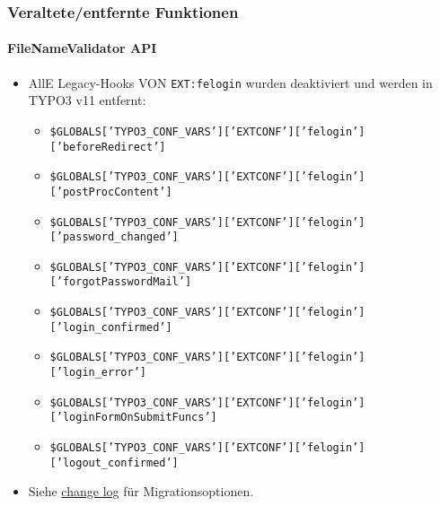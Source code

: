 
\begin{frame}[fragile]
	\frametitle{Veraltete/entfernte Funktionen}
	\framesubtitle{FileNameValidator API}

	\lstset{basicstyle=\tiny\ttfamily}

	\begin{itemize}
		\item AllE Legacy-Hooks VON \texttt{EXT:felogin} wurden deaktiviert und
			werden in TYPO3 v11 entfernt:

			\begin{itemize}\tiny
				\item \texttt{\$GLOBALS['TYPO3\_CONF\_VARS']['EXTCONF']['felogin']['beforeRedirect']}
				\item \texttt{\$GLOBALS['TYPO3\_CONF\_VARS']['EXTCONF']['felogin']['postProcContent']}
				\item \texttt{\$GLOBALS['TYPO3\_CONF\_VARS']['EXTCONF']['felogin']['password\_changed']}
				\item \texttt{\$GLOBALS['TYPO3\_CONF\_VARS']['EXTCONF']['felogin']['forgotPasswordMail']}
				\item \texttt{\$GLOBALS['TYPO3\_CONF\_VARS']['EXTCONF']['felogin']['login\_confirmed']}
				\item \texttt{\$GLOBALS['TYPO3\_CONF\_VARS']['EXTCONF']['felogin']['login\_error']}
				\item \texttt{\$GLOBALS['TYPO3\_CONF\_VARS']['EXTCONF']['felogin']['loginFormOnSubmitFuncs']}
				\item \texttt{\$GLOBALS['TYPO3\_CONF\_VARS']['EXTCONF']['felogin']['logout\_confirmed']}
			\end{itemize}

		\item Siehe
			\href{https://docs.typo3.org/c/typo3/cms-core/master/en-us/Changelog/10.4/Deprecation-88740-DeprecateFeloginPibasePlugin.html}{change log}
			für Migrationsoptionen.
	\end{itemize}

\end{frame}

